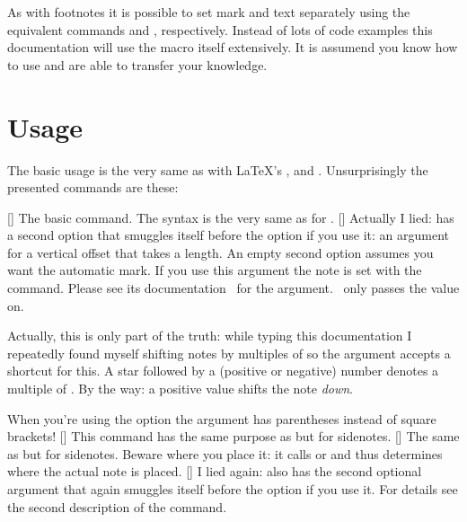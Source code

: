 \documentclass[load-preamble+]{cnltx-doc}
\begin{document}
As with footnotes it is possible to set mark and text separately using the
equivalent commands  and , respectively.
Instead of lots of code examples this documentation will use the 
macro itself extensively.  It is assumend you know how to use 
and are able to transfer your knowledge.

\section{Usage}\label{sec:usage}
The basic usage is the very same as with \LaTeX's ,
 and .  Unsurprisingly the presented
commands are these:
\begin{commands}
  []
    The basic command.  The syntax is the very same as for .
  []
    Actually I lied:  has a second option that smuggles itself
    before the  option if you use it: an argument for a vertical
    offset that takes a length. An empty second option assumes you want the
    automatic mark.  If you use this argument the note is set with the
     command.  Please see its documentation~\cite{pkg:marginnote}
    for the  argument.  \snotez\ only passes the value on.
    
    Actually, this is only part of the truth: while typing this documentation
    I repeatedly found myself shifting notes by multiples of
     so the argument accepts a shortcut for this.  A star
    \code{*} followed by a (positive or negative) number denotes a multiple of
    .  By the way: a positive value shifts the note
    \emph{down}.
    
    When you're using the  option the 
    argument has parentheses instead of square brackets!
  []
    This command has the same purpose as  but for
    sidenotes.
  []
    The same as  but for sidenotes.  Beware where you place
    it: it calls  or  and thus determines where
    the actual note is placed.
  []
    I lied again:  also has the second optional argument
     that again smuggles itself before the  option if
    you use it.  For details see the second description of the 
    command.
\end{commands}
\end{document}
